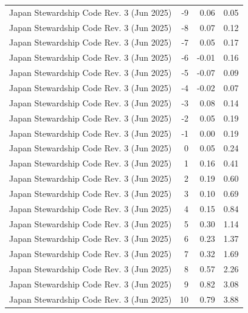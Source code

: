\begin{table}
\begin{tabular}{lrrr}
Japan Stewardship Code Rev. 3 (Jun 2025) & -9 & 0.06 & 0.05 \\
Japan Stewardship Code Rev. 3 (Jun 2025) & -8 & 0.07 & 0.12 \\
Japan Stewardship Code Rev. 3 (Jun 2025) & -7 & 0.05 & 0.17 \\
Japan Stewardship Code Rev. 3 (Jun 2025) & -6 & -0.01 & 0.16 \\
Japan Stewardship Code Rev. 3 (Jun 2025) & -5 & -0.07 & 0.09 \\
Japan Stewardship Code Rev. 3 (Jun 2025) & -4 & -0.02 & 0.07 \\
Japan Stewardship Code Rev. 3 (Jun 2025) & -3 & 0.08 & 0.14 \\
Japan Stewardship Code Rev. 3 (Jun 2025) & -2 & 0.05 & 0.19 \\
Japan Stewardship Code Rev. 3 (Jun 2025) & -1 & 0.00 & 0.19 \\
Japan Stewardship Code Rev. 3 (Jun 2025) & 0 & 0.05 & 0.24 \\
Japan Stewardship Code Rev. 3 (Jun 2025) & 1 & 0.16 & 0.41 \\
Japan Stewardship Code Rev. 3 (Jun 2025) & 2 & 0.19 & 0.60 \\
Japan Stewardship Code Rev. 3 (Jun 2025) & 3 & 0.10 & 0.69 \\
Japan Stewardship Code Rev. 3 (Jun 2025) & 4 & 0.15 & 0.84 \\
Japan Stewardship Code Rev. 3 (Jun 2025) & 5 & 0.30 & 1.14 \\
Japan Stewardship Code Rev. 3 (Jun 2025) & 6 & 0.23 & 1.37 \\
Japan Stewardship Code Rev. 3 (Jun 2025) & 7 & 0.32 & 1.69 \\
Japan Stewardship Code Rev. 3 (Jun 2025) & 8 & 0.57 & 2.26 \\
Japan Stewardship Code Rev. 3 (Jun 2025) & 9 & 0.82 & 3.08 \\
Japan Stewardship Code Rev. 3 (Jun 2025) & 10 & 0.79 & 3.88 \\
\bottomrule
\end{tabular}
\end{table}
